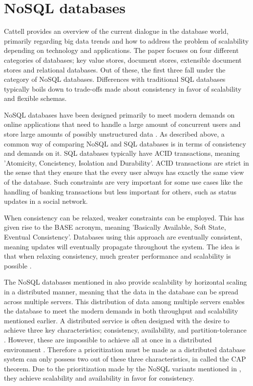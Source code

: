 \section{NoSQL databases}
Cattell \cite{Catell} provides an overview of the current dialogue in the database world, primarily regarding big data trends and how to address the problem of scalability depending on technology and applications. The paper focuses on four different categories of databases; key value stores, document stores, extensible document stores and relational databases. Out of these, the first three fall under the category of NoSQL databases. Differences with traditional SQL databases typically boils down to trade-offs made about consistency in favor of scalability and flexible schemas. 

NoSQL databases have been designed primarily to meet modern demands on online applications that need to handle a large amount of concurrent users and store large amounts of possibly unstructured data \cite{Catell}.
As described above, a common way of comparing NoSQL and SQL databases is in terms of consistency and demands on it. SQL databases typically have ACID \cite{Mullins} transactions, meaning 'Atomicity, Concistency, Isolation and Durability'. ACID transactions are strict in the sense that they ensure that the every user always has exactly the same view of the database. Such constraints are very important for some use cases like the handling of banking transactions but less important for others, such as status updates in a social network.

When consistency can be relaxed, weaker constraints can be employed. This has given rise to the BASE \cite{Catell} acronym, meaning 'Basically Available, Soft State, Eventual Consistency'. Databases using this approach are eventually consistent, meaning updates will eventually propagate throughout the system. The idea is that when relaxing consistency, much greater performance and scalability is possible \cite{Catell}.

The NoSQL databases mentioned in \cite{Catell} also provide scalability by horizontal scaling in a distributed manner, meaning that the data in the database can be spread across multiple servers. This distribution of data among multiple servers enables the database to meet the modern demands in both throughput and scalability \cite{Abadi} mentioned earlier. A distributed service is often designed with the desire to achieve three key characteristics; consistency, availability, and partition-tolerance \cite{Brewer}. However, these are impossible to achieve all at once in a distributed environment \cite{Brewer}. Therefore a prioritization must be made as a distributed database system can only possess two out of these three characteristics, in \cite{Brewer} called the CAP theorem. Due to the prioritization made by the NoSQL variants mentioned in \cite{Catell}, they achieve scalability and availability in favor for consistency. 

